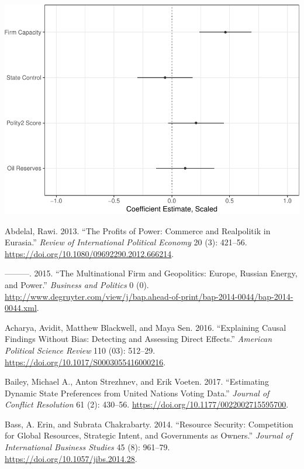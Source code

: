 \documentclass[11pt,]{book}
\begin{document}
\includegraphics{finalfig/basemodelplot-1.pdf}

\hypertarget{refs}{}
\leavevmode\hypertarget{ref-abdelal_profits_2013}{}%
Abdelal, Rawi. 2013. ``The Profits of Power: Commerce and Realpolitik in Eurasia.'' \emph{Review of International Political Economy} 20 (3): 421--56. \url{https://doi.org/10.1080/09692290.2012.666214}.

\leavevmode\hypertarget{ref-abdelal_multinational_2015}{}%
---------. 2015. ``The Multinational Firm and Geopolitics: Europe, Russian Energy, and Power.'' \emph{Business and Politics} 0 (0). \url{http://www.degruyter.com/view/j/bap.ahead-of-print/bap-2014-0044/bap-2014-0044.xml}.

\leavevmode\hypertarget{ref-acharya_explaining_2016}{}%
Acharya, Avidit, Matthew Blackwell, and Maya Sen. 2016. ``Explaining Causal Findings Without Bias: Detecting and Assessing Direct Effects.'' \emph{American Political Science Review} 110 (03): 512--29. \url{https://doi.org/10.1017/S0003055416000216}.

\leavevmode\hypertarget{ref-bailey_estimating_2017}{}%
Bailey, Michael A., Anton Strezhnev, and Erik Voeten. 2017. ``Estimating Dynamic State Preferences from United Nations Voting Data.'' \emph{Journal of Conflict Resolution} 61 (2): 430--56. \url{https://doi.org/10.1177/0022002715595700}.

\leavevmode\hypertarget{ref-bass_resource_2014}{}%
Bass, A. Erin, and Subrata Chakrabarty. 2014. ``Resource Security: Competition for Global Resources, Strategic Intent, and Governments as Owners.'' \emph{Journal of International Business Studies} 45 (8): 961--79. \url{https://doi.org/10.1057/jibs.2014.28}.
\end{document}
